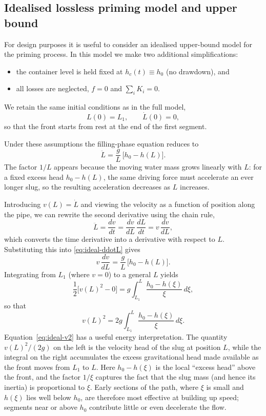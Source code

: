 \documentclass[11pt]{article}
\begin{document}
\subsection{Idealised lossless priming model and upper bound}

For design purposes it is useful to consider an idealised upper-bound model for the priming
process. In this model we make two additional simplifications:
\begin{itemize}
  \item the container level is held fixed at $h_c(t) \equiv h_0$ (no drawdown), and
  \item all losses are neglected, $f = 0$ and $\sum_i K_i = 0$.
\end{itemize}
We retain the same initial conditions as in the full model,
\[
  L(0) = L_1,\qquad \dot L(0) = 0,
\]
so that the front starts from rest at the end of the first segment.

Under these assumptions the filling-phase equation reduces to
\begin{equation}
  \ddot L = \frac{g}{L}\,\bigl[h_0 - h(L)\bigr].
  \label{eq:ideal-ddotL}
\end{equation}
The factor $1/L$ appears because the moving water mass grows linearly with $L$: for a fixed
excess head $h_0 - h(L)$, the same driving force must accelerate an ever longer slug, so the
resulting acceleration decreases as $L$ increases.

Introducing $v(L) = \dot L$ and viewing the velocity as a function of position along the
pipe, we can rewrite the second derivative using the chain rule,
\[
  \ddot L = \frac{dv}{dt} = \frac{dv}{dL}\,\frac{dL}{dt} = v\,\frac{dv}{dL},
\]
which converts the time derivative into a derivative with respect to $L$. Substituting this
into \eqref{eq:ideal-ddotL} gives
\begin{equation}
  v\,\frac{dv}{dL}
  = \frac{g}{L}\,\bigl[h_0 - h(L)\bigr].
  \label{eq:ideal-vdv}
\end{equation}
Integrating from $L_1$ (where $v=0$) to a general $L$ yields
\begin{equation}
  \frac{1}{2}\bigl[v(L)^2 - 0\bigr]
  = g\int_{L_1}^{L} \frac{h_0 - h(\xi)}{\xi}\,d\xi,
  \label{eq:ideal-int}
\end{equation}
so that
\begin{equation}
  v(L)^2
  = 2g\int_{L_1}^{L} \frac{h_0 - h(\xi)}{\xi}\,d\xi.
  \label{eq:ideal-v2}
\end{equation}
Equation~\eqref{eq:ideal-v2} has a useful energy interpretation. The quantity $v(L)^2/(2g)$
on the left is the velocity head of the slug at position $L$, while the integral on the right
accumulates the excess gravitational head made available as the front moves from $L_1$ to $L$.
Here $h_0-h(\xi)$ is the local ``excess head'' above the front, and the factor $1/\xi$
captures the fact that the slug mass (and hence its inertia) is proportional to $\xi$.
Early sections of the path, where $\xi$ is small and $h(\xi)$ lies well below $h_0$, are
therefore most effective at building up speed; segments near or above $h_0$ contribute
little or even decelerate the flow.
\end{document}
